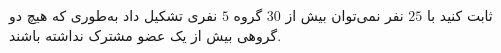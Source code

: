 \EXERCISE
ثابت کنید با
$25$
نفر نمی‌توان بیش از
$30$
گروه
$5$
نفری تشکیل داد به‌طوری که هیچ دو گروهی بیش از یک عضو مشترک نداشته باشند.